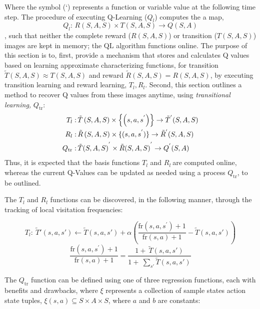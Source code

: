 \documentclass[compsoc,journal,letterpaper,10pt,draftclsnofoot,onecolumn]{IEEEtran}
\begin{document}
Where the symbol (`) represents a function or variable value at the
following time step. The procedure of executing Q-Learning (\(Q_{l}\))
computes the a map,
\begin{equation}
Q_{l}:\,R(S,A,S) \times T(S,A,S) \rightarrow Q(S,A)
\end{equation}
, such that neither the complete reward (\(R(S,A,S)\)) or transition
(\(T(S,A,S)\)) images are kept in memory; the \(\text{QL}\) algorithm
functions \(\text{online}\). The purpose of this section is to, first,
provide a mechanism that stores and calculates Q values based on
learning approximate characterizing functions, for transition
\(\tilde{T}(S,A,S) \approx T(S,A,S)\) and reward
\(\tilde{R}\left( S,A,S \right) = R(S,A,S)\), by executing transition
learning and reward learning, \(T_{l},R_{l}\). Second, this section
outlines a method to recover Q values from these images anytime, using
\emph{transitional learning,} \(Q_{\text{tr}}\):
\begin{align}
%
T_{l}:&\,\tilde{T}\left( S,A,S \right) \times \left\{ \left( s,a,s^{'} \right) \right\} \rightarrow {\tilde{T}}^{'}(S,A,S)\notag\\
%
R_{l}:&\,\tilde{R}\left( S,A,S \right) \times \{(s,a,s^{'})\} \rightarrow {\tilde{R}}^{'}(S,A,S)\\
%
Q_{\text{tr}}:&\,{\tilde{T}(S,A,S)}^{'} \times {\tilde{R}(S,A,S)}^{'} \rightarrow Q^{'}(S,A)\notag
%
\end{align}
Thus, it is expected that the basis functions \(T_{l}\) and
\(R_{l}\ \)are computed online, whereas the current Q-Values can be
updated as needed using a process \(Q_{\text{tr}}\), to be outlined.

The \(T_{l}\) and \(R_{l}\) functions can be discovered, in the
following manner, through the tracking of local visitation frequencies:

 
\begin{equation*}
T_{l}:\ \tilde{T}'\left( s,a,s' \right) \leftarrow \tilde{T}\left( s,a,s' \right) + \alpha\left( \frac{\text{fr}\left( s,a,s^{'} \right) + 1}{\text{fr}\left( s,a \right) + 1} - \tilde{T}\left( s,a,s' \right) \right)
\end{equation*}
\begin{equation*}
\frac{\text{fr}\left( s,a,s^{'} \right) + 1}{\text{fr}\left( s,a \right) + 1} = \frac{1 + \ \tilde{T}\left( s,a,s' \right)}{1 + \ \sum_{s'}^{\ }{\tilde{T}\left( s,a,s' \right)}} 
\end{equation*}

The \(Q_{\text{tr}}\) function can be defined using one of three
regression functions, each with benefits and drawbacks, where \(\xi\)
represents a collection of sample states action state tuples,
\(\xi\left( s,a \right) \subseteq S \times A \times S\), where \(a\) and
\(b\) are constants:
\end{document}
